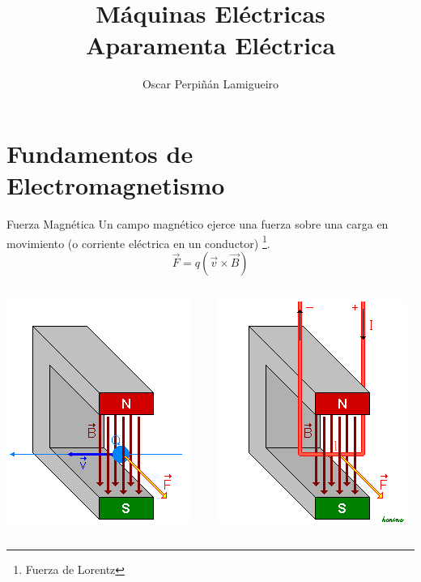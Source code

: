 \documentclass[xcolor={usenames,svgnames,dvipsnames}]{beamer}
\author{Oscar Perpiñán Lamigueiro}
\date{}
\title{Máquinas Eléctricas \\ Aparamenta Eléctrica}
\begin{document}
\maketitle

\section{Fundamentos de Electromagnetismo}
\label{sec:orge994ecc}

\begin{frame}[label={sec:orgb980748}]{Fuerza Magnética}
Un campo magnético ejerce una fuerza sobre una carga en movimiento (o corriente eléctrica en un conductor) \footnote{Fuerza de Lorentz}.
\[
\vec{F} = q (\vec{v} \times \vec{B})
\]

\begin{columns}
\begin{column}{0.5\columnwidth}
\begin{center}
\includegraphics[height=0.5\textheight]{../figs/Fuerza_Lorentz.png}
\end{center}
\end{column}

\begin{column}{0.5\columnwidth}
\begin{center}
\includegraphics[height=0.5\textheight]{../figs/Fuerza_Lorentz_Conductor.png}
\end{center}
\end{column}
\end{columns}
\end{frame}
\end{document}
